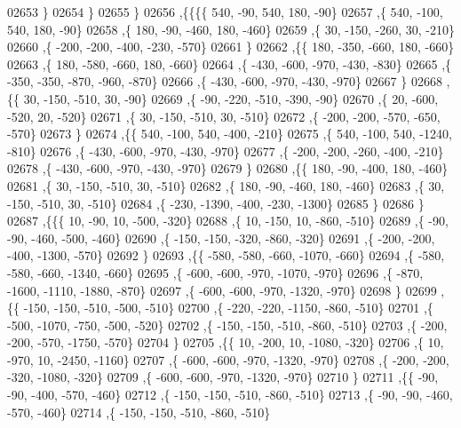 \begin{DoxyCode}
02653     \}
02654    \}
02655   \}
02656  ,\{\{\{\{   540,   -90,   540,   180,   -90\}
02657     ,\{   540,  -100,   540,   180,   -90\}
02658     ,\{   180,   -90,  -460,   180,  -460\}
02659     ,\{    30,  -150,  -260,    30,  -210\}
02660     ,\{  -200,  -200,  -400,  -230,  -570\}
02661     \}
02662    ,\{\{   180,  -350,  -660,   180,  -660\}
02663     ,\{   180,  -580,  -660,   180,  -660\}
02664     ,\{  -430,  -600,  -970,  -430,  -830\}
02665     ,\{  -350,  -350,  -870,  -960,  -870\}
02666     ,\{  -430,  -600,  -970,  -430,  -970\}
02667     \}
02668    ,\{\{    30,  -150,  -510,    30,   -90\}
02669     ,\{   -90,  -220,  -510,  -390,   -90\}
02670     ,\{    20,  -600,  -520,    20,  -520\}
02671     ,\{    30,  -150,  -510,    30,  -510\}
02672     ,\{  -200,  -200,  -570,  -650,  -570\}
02673     \}
02674    ,\{\{   540,  -100,   540,  -400,  -210\}
02675     ,\{   540,  -100,   540, -1240,  -810\}
02676     ,\{  -430,  -600,  -970,  -430,  -970\}
02677     ,\{  -200,  -200,  -260,  -400,  -210\}
02678     ,\{  -430,  -600,  -970,  -430,  -970\}
02679     \}
02680    ,\{\{   180,   -90,  -400,   180,  -460\}
02681     ,\{    30,  -150,  -510,    30,  -510\}
02682     ,\{   180,   -90,  -460,   180,  -460\}
02683     ,\{    30,  -150,  -510,    30,  -510\}
02684     ,\{  -230, -1390,  -400,  -230, -1300\}
02685     \}
02686    \}
02687   ,\{\{\{    10,   -90,    10,  -500,  -320\}
02688     ,\{    10,  -150,    10,  -860,  -510\}
02689     ,\{   -90,   -90,  -460,  -500,  -460\}
02690     ,\{  -150,  -150,  -320,  -860,  -320\}
02691     ,\{  -200,  -200,  -400, -1300,  -570\}
02692     \}
02693    ,\{\{  -580,  -580,  -660, -1070,  -660\}
02694     ,\{  -580,  -580,  -660, -1340,  -660\}
02695     ,\{  -600,  -600,  -970, -1070,  -970\}
02696     ,\{  -870, -1600, -1110, -1880,  -870\}
02697     ,\{  -600,  -600,  -970, -1320,  -970\}
02698     \}
02699    ,\{\{  -150,  -150,  -510,  -500,  -510\}
02700     ,\{  -220,  -220, -1150,  -860,  -510\}
02701     ,\{  -500, -1070,  -750,  -500,  -520\}
02702     ,\{  -150,  -150,  -510,  -860,  -510\}
02703     ,\{  -200,  -200,  -570, -1750,  -570\}
02704     \}
02705    ,\{\{    10,  -200,    10, -1080,  -320\}
02706     ,\{    10,  -970,    10, -2450, -1160\}
02707     ,\{  -600,  -600,  -970, -1320,  -970\}
02708     ,\{  -200,  -200,  -320, -1080,  -320\}
02709     ,\{  -600,  -600,  -970, -1320,  -970\}
02710     \}
02711    ,\{\{   -90,   -90,  -400,  -570,  -460\}
02712     ,\{  -150,  -150,  -510,  -860,  -510\}
02713     ,\{   -90,   -90,  -460,  -570,  -460\}
02714     ,\{  -150,  -150,  -510,  -860,  -510\}

\end{DoxyCode}
